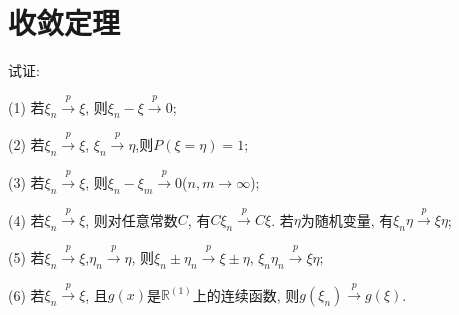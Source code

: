 \chapter{收敛定理}
		\begin{yyEx}
		试证:
		\begin{blist}
			\item[(1)] 若$\xi_n\stackrel{p}{\rightarrow}\xi$, 则$\xi_n-\xi\stackrel{p}{\rightarrow}0$;
			\item[(2)] 若$\xi_n\stackrel{p}{\rightarrow}\xi$, $\xi_n\stackrel{p}{\rightarrow}\eta$,则$P(\xi=\eta) = 1$;
			\item[(3)] 若$\xi_n\stackrel{p}{\rightarrow}\xi$, 则$\xi_n-\xi_m\stackrel{p}{\rightarrow}0$($n,m\to\infty$);
			\item[(4)]
			若$\xi_n\stackrel{p}{\rightarrow}\xi$, 则对任意常数$C$, 有$C\xi_n\stackrel{p}{\rightarrow}C\xi$. 若$\eta$为随机变量, 有$\xi_n\eta\stackrel{p}{\rightarrow}\xi\eta$;
			\item[(5)]
			若$\xi_n\stackrel{p}{\rightarrow}\xi$,$\eta_n\stackrel{p}{\rightarrow}\eta$, 则$\xi_n\pm\eta_n\stackrel{p}{\rightarrow}\xi\pm\eta$, $\xi_n\eta_n\stackrel{p}{\rightarrow}\xi\eta$;
			\item[(6)]
			若$\xi_n\stackrel{p}{\rightarrow}\xi$, 且$g(x)$是$\mathbb{R}^{(1)}$上的连续函数, 则$g(\xi_n)\stackrel{p}{\rightarrow}g(\xi)$.
		\end{blist}
	\end{yyEx}
	
